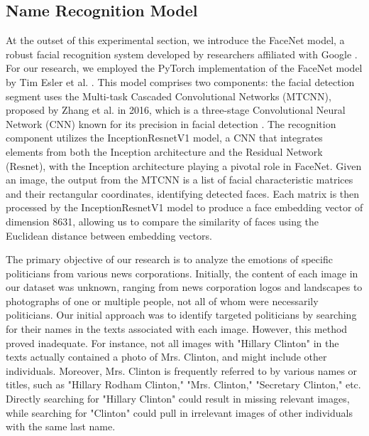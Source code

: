 \documentclass[sigconf]{acmart}
\begin{document}
\subsection{Name Recognition Model}

At the outset of this experimental section, we introduce the FaceNet model, a robust facial recognition system developed by researchers affiliated with Google \cite{facenet}. For our research, we employed the PyTorch implementation of the FaceNet model by Tim Esler et al. \cite{facenetpytorch}. This model comprises two components: the facial detection segment uses the Multi-task Cascaded Convolutional Networks (MTCNN), proposed by Zhang et al. in 2016, which is a three-stage Convolutional Neural Network (CNN) known for its precision in facial detection \cite{mtcnn}. The recognition component utilizes the InceptionResnetV1 model, a CNN that integrates elements from both the Inception architecture and the Residual Network (Resnet), with the Inception architecture playing a pivotal role in FaceNet. Given an image, the output from the MTCNN is a list of facial characteristic matrices and their rectangular coordinates, identifying detected faces. Each matrix is then processed by the InceptionResnetV1 model to produce a face embedding vector of dimension 8631, allowing us to compare the similarity of faces using the Euclidean distance between embedding vectors.


The primary objective of our research is to analyze the emotions of specific politicians from various news corporations. Initially, the content of each image in our dataset was unknown, ranging from news corporation logos and landscapes to photographs of one or multiple people, not all of whom were necessarily politicians. Our initial approach was to identify targeted politicians by searching for their names in the texts associated with each image. However, this method proved inadequate. For instance, not all images with "Hillary Clinton" in the texts actually contained a photo of Mrs. Clinton, and might include other individuals. Moreover, Mrs. Clinton is frequently referred to by various names or titles, such as "Hillary Rodham Clinton," "Mrs. Clinton," "Secretary Clinton," etc. Directly searching for "Hillary Clinton" could result in missing relevant images, while searching for "Clinton" could pull in irrelevant images of other individuals with the same last name.
\end{document}
